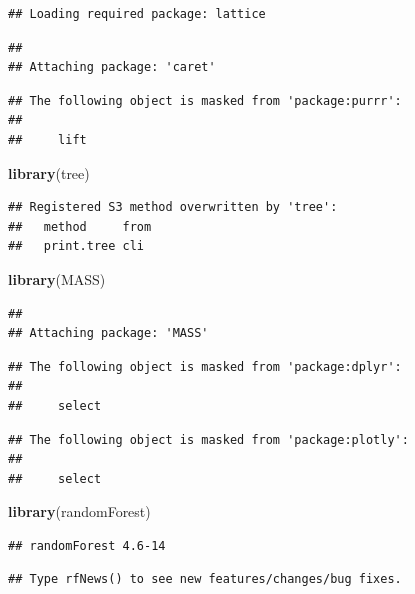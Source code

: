 \documentclass[
]{article}
\newenvironment{Shaded}{\begin{snugshade}}{\end{snugshade}}
\newcommand{\KeywordTok}[1]{\textcolor[rgb]{0.13,0.29,0.53}{\textbf{#1}}}
\newcommand{\NormalTok}[1]{#1}
\begin{document}
\begin{verbatim}
## Loading required package: lattice
\end{verbatim}

\begin{verbatim}
## 
## Attaching package: 'caret'
\end{verbatim}

\begin{verbatim}
## The following object is masked from 'package:purrr':
## 
##     lift
\end{verbatim}

\begin{Shaded}
\begin{Highlighting}[]
\KeywordTok{library}\NormalTok{(tree)}
\end{Highlighting}
\end{Shaded}

\begin{verbatim}
## Registered S3 method overwritten by 'tree':
##   method     from
##   print.tree cli
\end{verbatim}

\begin{Shaded}
\begin{Highlighting}[]
\KeywordTok{library}\NormalTok{(MASS)}
\end{Highlighting}
\end{Shaded}

\begin{verbatim}
## 
## Attaching package: 'MASS'
\end{verbatim}

\begin{verbatim}
## The following object is masked from 'package:dplyr':
## 
##     select
\end{verbatim}

\begin{verbatim}
## The following object is masked from 'package:plotly':
## 
##     select
\end{verbatim}

\begin{Shaded}
\begin{Highlighting}[]
\KeywordTok{library}\NormalTok{(randomForest)}
\end{Highlighting}
\end{Shaded}

\begin{verbatim}
## randomForest 4.6-14
\end{verbatim}

\begin{verbatim}
## Type rfNews() to see new features/changes/bug fixes.
\end{verbatim}
\end{document}
